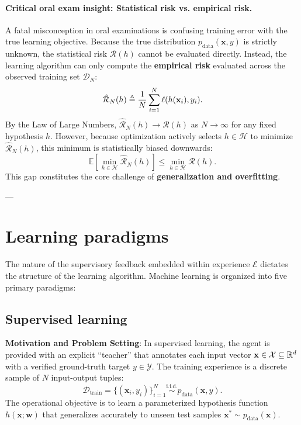 \paragraph{Critical oral exam insight: Statistical risk vs. empirical risk.}
A fatal misconception in oral examinations is confusing training error with the true learning objective. Because the true distribution $p_{\text{data}}(\mathbf{x}, y)$ is strictly unknown, the statistical risk $\mathcal{R}(h)$ cannot be evaluated directly.
Instead, the learning algorithm can only compute the \textbf{empirical risk} evaluated across the observed training set $\mathcal{D}_N$:
\begin{equation}
\hat{\mathcal{R}}_N(h) \triangleq \frac{1}{N} \sum_{i=1}^N \ell(h(\mathbf{x}_i), y_i).
\label{eq:empirical_risk_formula}
\end{equation}
By the Law of Large Numbers, $\hat{\mathcal{R}}_N(h) \to \mathcal{R}(h)$ as $N \to \infty$ for any fixed hypothesis $h$. However, because optimization actively selects $h \in \mathcal{H}$ to minimize $\hat{\mathcal{R}}_N(h)$, this minimum is statistically biased downwards:
\begin{equation}
\mathbb{E}\left[ \min_{h \in \mathcal{H}} \hat{\mathcal{R}}_N(h) \right] \le \min_{h \in \mathcal{H}} \mathcal{R}(h).
\end{equation}
This gap constitutes the core challenge of \textbf{generalization and overfitting}.

---

\section{Learning paradigms}
\label{sec:learning_paradigms}

The nature of the supervisory feedback embedded within experience $\mathcal{E}$ dictates the structure of the learning algorithm. Machine learning is organized into five primary paradigms:

\subsection{Supervised learning}
\label{sec:supervised_learning}

\textbf{Motivation and Problem Setting}: In supervised learning, the agent is provided with an explicit ``teacher'' that annotates each input vector $\mathbf{x} \in \mathcal{X} \subseteq \mathbb{R}^d$ with a verified ground-truth target $y \in \mathcal{Y}$. The training experience is a discrete sample of $N$ input-output tuples:
\begin{equation}
\mathcal{D}_{\text{train}} = \{(\mathbf{x}_i, y_i)\}_{i=1}^N \overset{\text{i.i.d.}}{\sim} p_{\text{data}}(\mathbf{x}, y).
\end{equation}
The operational objective is to learn a parameterized hypothesis function $h(\mathbf{x}; \mathbf{w})$ that generalizes accurately to unseen test samples $\mathbf{x}^* \sim p_{\text{data}}(\mathbf{x})$.


